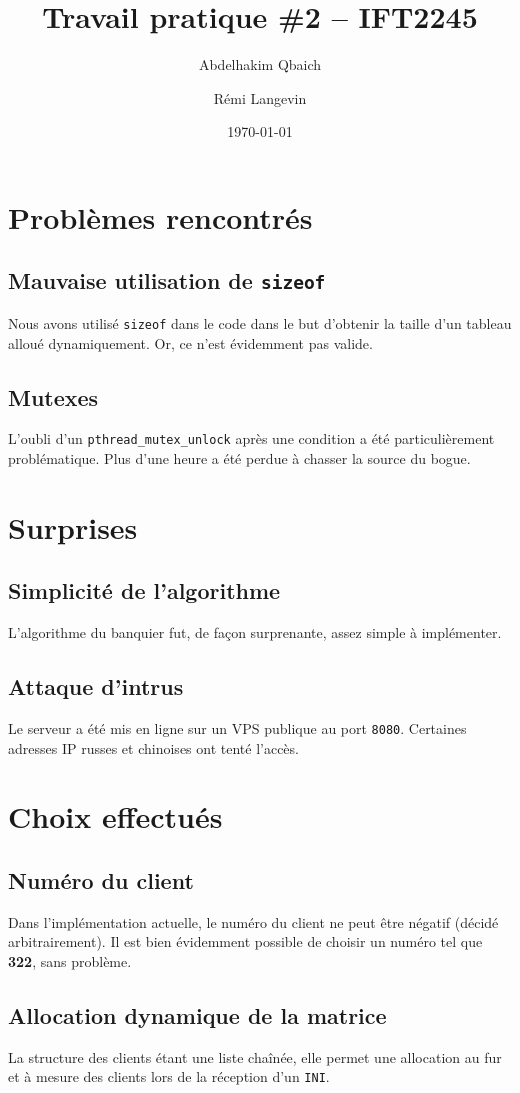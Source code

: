 \documentclass[12pt, letterpaper]{article}
\title{Travail pratique \#2 -- IFT2245}
\author{Abdelhakim Qbaich \and Rémi Langevin}
\date{\today}
\begin{document}
\maketitle

\section*{Problèmes rencontrés}
\subsection*{Mauvaise utilisation de \texttt{sizeof}}
Nous avons utilisé \texttt{sizeof} dans le code dans le but d'obtenir la taille
d'un tableau alloué dynamiquement. Or, ce n'est évidemment pas valide.
\subsection*{Mutexes}
L'oubli d'un \texttt{pthread\_mutex\_unlock} après une condition a été
particulièrement problématique. Plus d'une heure a été perdue à chasser la
source du bogue.

\section*{Surprises}
\subsection*{Simplicité de l'algorithme}
L'algorithme du banquier fut, de façon surprenante, assez simple à implémenter.
\subsection*{Attaque d'intrus}
Le serveur a été mis en ligne sur un VPS publique au port \texttt{8080}.
Certaines adresses IP russes et chinoises ont tenté l'accès.

\section*{Choix effectués}
\subsection*{Numéro du client}
Dans l'implémentation actuelle, le numéro du client ne peut être négatif
(décidé arbitrairement). Il est bien évidemment possible de choisir un numéro
tel que \textbf{322}, sans problème.
\subsection*{Allocation dynamique de la matrice}
La structure des clients étant une liste chaînée, elle permet une allocation au
fur et à mesure des clients lors de la réception d'un \texttt{INI}.
\end{document}

